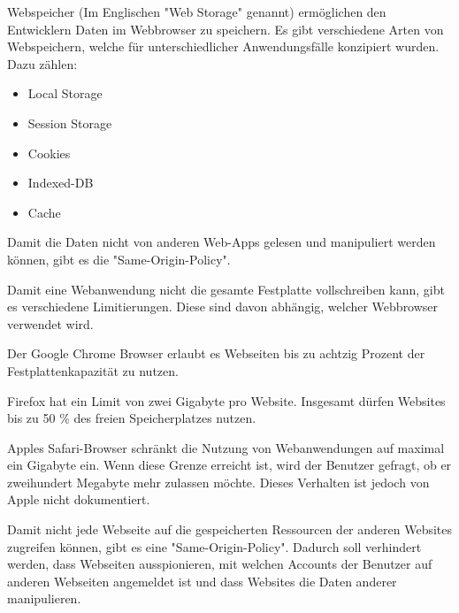 

Webspeicher (Im Englischen "Web Storage" genannt) ermöglichen den Entwicklern %
Daten im Webbrowser zu speichern.
Es gibt verschiedene Arten von Webspeichern, welche für unterschiedlicher Anwendungsfälle konzipiert wurden. Dazu zählen:

\begin{itemize}
    \item Local Storage
    \item Session Storage
    \item Cookies
    \item Indexed-DB
    \item Cache
\end{itemize}

Damit die Daten nicht von anderen Web-Apps gelesen und manipuliert werden können, gibt es die "Same-Origin-Policy".


Damit eine Webanwendung nicht die gesamte Festplatte vollschreiben kann, gibt es verschiedene Limitierungen. Diese sind davon abhängig, welcher Webbrowser verwendet wird.

Der Google Chrome Browser erlaubt es Webseiten bis zu achtzig Prozent der Festplattenkapazität zu nutzen.

Firefox hat ein Limit von zwei Gigabyte pro Website. Insgesamt dürfen Websites bis zu 50 \% des freien Speicherplatzes nutzen.

Apples Safari-Browser schränkt die Nutzung von Webanwendungen auf maximal ein Gigabyte ein. Wenn diese Grenze erreicht ist, wird der Benutzer gefragt, ob er zweihundert Megabyte mehr zulassen möchte. Dieses Verhalten ist jedoch von Apple nicht dokumentiert. \cite{WebDevStorage}


Damit nicht jede Webseite auf die gespeicherten Ressourcen der anderen Websites zugreifen können, gibt es eine "Same-Origin-Policy". Dadurch soll verhindert werden, dass Webseiten ausspionieren, mit welchen Accounts der Benutzer auf anderen Webseiten angemeldet ist und dass Websites die Daten anderer manipulieren.

